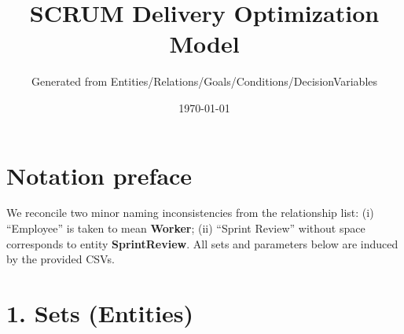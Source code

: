 \documentclass[11pt,a4paper]{article}
\title{SCRUM Delivery Optimization Model}
\author{Generated from Entities/Relations/Goals/Conditions/DecisionVariables}
\date{\today}
\begin{document}
\maketitle
\tableofcontents
\newpage

\section*{Notation preface}
We reconcile two minor naming inconsistencies from the relationship list: (i) ``Employee'' is taken to mean \textbf{Worker}; (ii) ``Sprint Review'' without space corresponds to entity \textbf{SprintReview}. All sets and parameters below are induced by the provided CSVs.

\section{1. Sets (Entities)}
\end{document}
